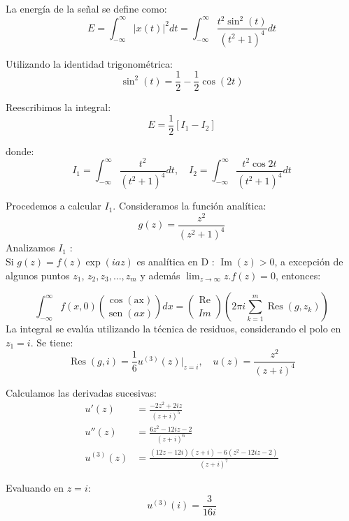 \documentclass[a4paper,12pt]{article}
\begin{document}
La energía de la señal se define como:
\begin{equation*}
    E = \int_{-\infty}^{\infty} |x(t)|^2 dt = \int_{-\infty}^{\infty} \frac{t^2 \sin^2(t)}{(t^2+1)^4} dt
\end{equation*}

Utilizando la identidad trigonométrica:
\begin{equation*}
    \sin^2(t) = \frac{1}{2} - \frac{1}{2} \cos(2t)
\end{equation*}

Reescribimos la integral:
\begin{equation*}
    E = \frac{1}{2} \left[ I_1 - I_2 \right]
\end{equation*}

donde:
\begin{equation*}
    I_1 = \int_{-\infty}^{\infty} \frac{t^2}{(t^2+1)^4} dt, \quad I_2 = \int_{-\infty}^{\infty} \frac{t^2 \cos 2t}{(t^2+1)^4} dt
\end{equation*}

Procedemos a calcular $I_1$. Consideramos la función analítica:
\begin{equation*}
    g(z) = \frac{z^2}{(z^2+1)^4}
\end{equation*}
Analizamos $I_{1}$ :\\
Si $g(z)=f(z) \exp (i a z)$ es analítica en D : $\operatorname{Im}(z)>0$, a excepción de algunos puntos $z_{1}$, $z_{2}, z_{3}, \ldots, z_{m}$ y además $\lim _{z \rightarrow \infty} z . f(z)=0$, entonces:

$$
\int_{-\infty}^{\infty} f(x, 0)\binom{\cos (\mathrm{ax})}{\operatorname{sen}(a x)} d x=\binom{\operatorname{Re}}{I m}\left(2 \pi i \sum_{k=1}^{m} \operatorname{Res}\left(g, z_{k}\right)\right)
$$
La integral se evalúa utilizando la técnica de residuos, considerando el polo en $z_1 = i$. Se tiene:
\begin{equation*}
    \operatorname{Res}(g, i) = \frac{1}{6} u^{(3)}(z)\Big|_{z=i}, \quad u(z) = \frac{z^2}{(z+i)^4}
\end{equation*}

Calculamos las derivadas sucesivas:
\begin{align*}
    u'(z) &= \frac{-2z^2 + 2iz}{(z+i)^5} \\
    u''(z) &= \frac{6z^2 - 12iz - 2}{(z+i)^6} \\
    u^{(3)}(z) &= \frac{(12z - 12i)(z+i) - 6(z^2 - 12iz - 2)}{(z+i)^7}
\end{align*}

Evaluando en $z = i$:
\begin{equation*}
    u^{(3)}(i) = \frac{3}{16i}
\end{equation*}
\end{document}
